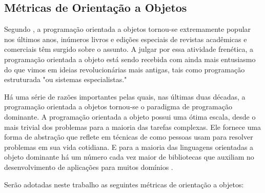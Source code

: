 \subsection{Métricas de Orientação a Objetos}

Segundo , a programação orientada a objetos tornou-se extremamente popular nos últimos anos, inúmeros livros e edições especiais de revistas acadêmicas e comerciais têm surgido sobre o assunto. A julgar por essa atividade frenética, a programação orientada a objeto está sendo recebida com ainda mais entusiasmo do que vimos em ideias revolucionárias mais antigas, tais como programação estruturada "ou sistemas especialistas." 

Há uma série de razões importantes pelas quais, nas últimas duas décadas, a  
programação orientada a objetos tornou-se o paradigma de programação dominante. A programação orientada a objeto possui uma ótima escala, desde o mais trivial dos problemas para a maioria das tarefas complexas. Ele fornece uma forma de abstração que reflete em técnicas de como pessoas usam para resolver problemas em sua vida cotidiana. E para a maioria das linguagens orientadas a objeto dominante há um número cada vez maior de bibliotecas que auxiliam no desenvolvimento de aplicações para muitos domínios \cite{budd_introduction_2002}.

Serão adotadas neste trabalho as seguintes métricas de orientação a objetos:

